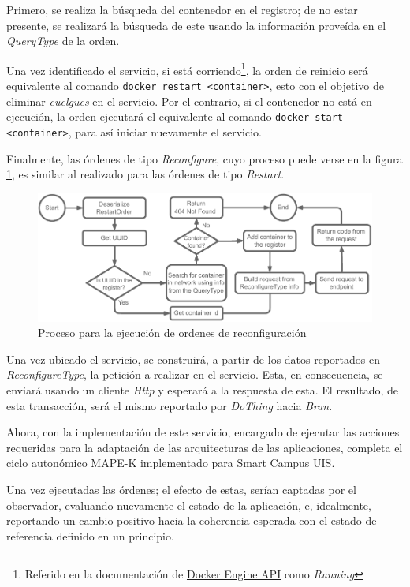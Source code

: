Primero, se realiza la búsqueda del contenedor en el registro; de no estar presente, se realizará la búsqueda de este usando la información proveída en el \textit{QueryType} de la orden.

Una vez identificado el servicio, si está corriendo\footnote{Referido en la documentación de \href{https://docs.docker.com/engine/api/v1.43/\#tag/Container/operation/ContainerInspect}{Docker Engine API} como \textit{Running}}, la orden de reinicio será equivalente al comando \texttt{docker restart <container>}, esto con el objetivo de eliminar \textit{cuelgues} en el servicio. Por el contrario, si el contenedor no está en ejecución, la orden ejecutará el equivalente al comando \texttt{docker start <container>}, para así iniciar nuevamente el servicio.

Finalmente, las órdenes de tipo \textit{Reconfigure}, cuyo proceso puede verse en la figura \ref{fig:DoThingReconfig}, es similar al realizado para las órdenes de tipo \textit{Restart}. 

\begin{figure}[ht]
    \centering
    \caption{Proceso para la ejecución de ordenes de reconfiguración}
    \label{fig:DoThingReconfig}
    \includegraphics[width=0.8\linewidth]{images/DoThingReconfig.pdf}
\end{figure}

Una vez ubicado el servicio, se construirá, a partir de los datos reportados en \textit{ReconfigureType}, la petición a realizar en el servicio. Esta, en consecuencia, se enviará usando un cliente \textit{Http} y esperará a la respuesta de esta. El resultado, de esta transacción, será el mismo reportado por \textit{DoThing} hacia \textit{Bran}.

Ahora, con la implementación de este servicio, encargado de ejecutar las acciones requeridas para la adaptación de las arquitecturas de las aplicaciones, completa el ciclo autonómico MAPE-K implementado para Smart Campus UIS. 

Una vez ejecutadas las órdenes; el efecto de estas, serían captadas por el observador, evaluando nuevamente el estado de la aplicación, e, idealmente, reportando un cambio positivo hacia la coherencia esperada con el estado de referencia definido en un principio.

